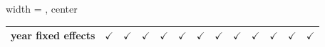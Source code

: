 \begin{table}[htbp]
\begin{adjustbox}{width = \textwidth, center}
\begin{tabular}{lcccccccccccc}
         year fixed effects                                 & $\checkmark$          & $\checkmark$  & $\checkmark$  & $\checkmark$  & $\checkmark$  & $\checkmark$  & $\checkmark$  & $\checkmark$  & $\checkmark$  & $\checkmark$  & $\checkmark$  & $\checkmark$\\   
         \bottomrule
      \end{tabular}
   \end{adjustbox}
\end{table}


